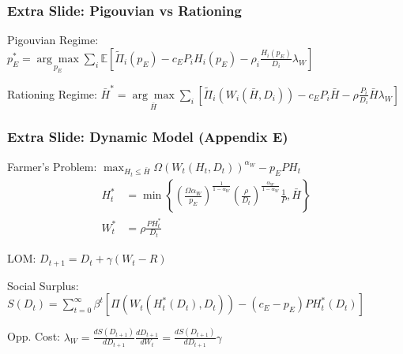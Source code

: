 \documentclass[handout,aspectratio=169]{beamer} %
\begin{document}
\begin{frame}
    \frametitle{Extra Slide: Pigouvian vs Rationing}
    \label{pigouvian}
    Pigouvian Regime: $p_{E}^{*}=\underset{p_{E}}{\arg \max } \sum_{i} \mathbb{E}\left[\widetilde{\Pi}_{i}\left(p_{E}\right)-c_{E} P_{i} H_{i}\left(p_{E}\right)-\rho_{i} \frac{H_{i}\left(p_{E}\right)}{D_{i}} \lambda_{W}\right]$

    Rationing Regime: $\bar{H}^* = \underset{\bar{H}}{\arg \max}\sum_{i}\left[\widetilde{\Pi}_{i}\left(W_{i}\left(\bar{H}, D_{i}\right)\right)-c_{E} P_{i} \bar{H}-\rho \frac{P_{i}}{D_{i}} \bar{H} \lambda_{W}\right]$
    \vfill
\end{frame}

\begin{frame}
    \frametitle{Extra Slide: Dynamic Model (Appendix E)}
    \label{pigouvian}
    Farmer's Problem: $\max _{H_{t} \leq \bar{H}} \Omega\left(W_{t}\left(H_{t}, D_{t}\right)\right)^{\alpha_{W}}-p_{E} P H_{t}$
    \begin{align*}
        H_{t}^{*} &=\min \left\{\left(\frac{\Omega \alpha_{W}}{p_{E}}\right)^{\frac{1}{1-\alpha_{W}}}\left(\frac{\rho}{D_{t}}\right)^{\frac{\alpha_{W}}{1-\alpha_{W}}} \frac{1}{P}, \bar{H}\right\} \\
        W_{t}^{*} &=\rho \frac{P H_{t}^{*}}{D_{t}}
    \end{align*}

    LOM: $D_{t+1}=D_{t}+\gamma\left(W_{t}-R\right)$

    Social Surplus: $S\left(D_{t}\right)=\sum_{t=0}^{\infty} \beta^{t}\left[\Pi\left(W_{t}\left(H_{t}^{*}\left(D_{t}\right), D_{t}\right)\right)-\left(c_{E}-p_{E}\right) P H_{t}^{*}\left(D_{t}\right)\right]$

    Opp. Cost: $\lambda_{W}=\frac{d S\left(D_{t+1}\right)}{d D_{t+1}} \frac{d D_{t+1}}{d W_{t}}=\frac{d S\left(D_{t+1}\right)}{d D_{t+1}} \gamma$
    
\end{frame}
\end{document}
